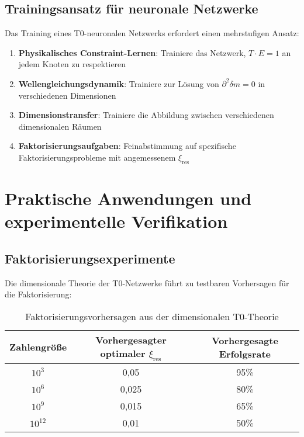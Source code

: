 \documentclass[12pt,a4paper]{article}
\newcommand{\xipar}{\ensuremath{\xi}}
\newcommand{\deltafield}{\ensuremath{\delta m}}
\begin{document}
	\subsection{Trainingsansatz für neuronale Netzwerke}
	\label{subsec:training_approach}
	
	Das Training eines T0-neuronalen Netzwerks erfordert einen mehrstufigen Ansatz:
	
	\begin{enumerate}
		\item \textbf{Physikalisches Constraint-Lernen}: Trainiere das Netzwerk, $T \cdot E = 1$ an jedem Knoten zu respektieren
		\item \textbf{Wellengleichungsdynamik}: Trainiere zur Lösung von $\partial^2 \deltafield = 0$ in verschiedenen Dimensionen
		\item \textbf{Dimensionstransfer}: Trainiere die Abbildung zwischen verschiedenen dimensionalen Räumen
		\item \textbf{Faktorisierungsaufgaben}: Feinabstimmung auf spezifische Faktorisierungsprobleme mit angemessenem $\xipar_{\text{res}}$
	\end{enumerate}
	
	\section{Praktische Anwendungen und experimentelle Verifikation}
	\label{sec:practical_applications}
	
	\subsection{Faktorisierungsexperimente}
	\label{subsec:factorization_experiments}
	
	Die dimensionale Theorie der T0-Netzwerke führt zu testbaren Vorhersagen für die Faktorisierung:
	
	\begin{table}[htbp]
		\centering
		\begin{tabular}{ccc}
			\toprule
			\textbf{Zahlengröße} & \textbf{Vorhergesagter optimaler $\xipar_{\text{res}}$} & \textbf{Vorhergesagte Erfolgsrate} \\
			\midrule
			$10^3$ & 0,05 & 95\% \\
			$10^6$ & 0,025 & 80\% \\
			$10^9$ & 0,015 & 65\% \\
			$10^{12}$ & 0,01 & 50\% \\
			\bottomrule
		\end{tabular}
		\caption{Faktorisierungsvorhersagen aus der dimensionalen T0-Theorie}
		\label{tab:factorization_predictions}
	\end{table}
	
\end{document}
